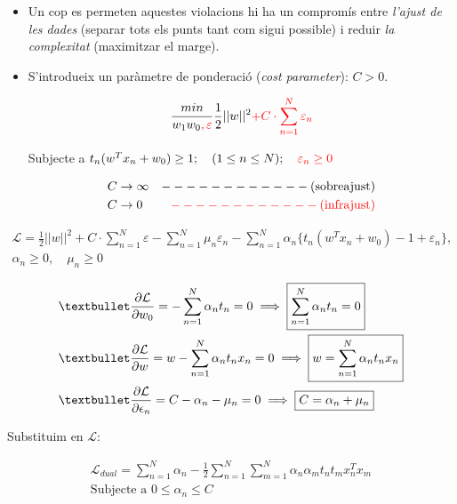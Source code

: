 \documentclass[a4paper]{article}
\begin{document}
\begin{itemize}
	\item Un cop es permeten aquestes violacions hi ha un compromís entre \emph{l'ajust de les dades} (separar tots els punts tant com sigui possible) i reduir \emph{la complexitat} (maximitzar el marge).
	
	\item S'introdueix un paràmetre de ponderació (\emph{cost parameter}): $C > 0$.
	
	$$
	\frac{min}{w_1 w_0 \textcolor{red}{,\varepsilon}} \frac{1}{2} ||w||^2 \textcolor{red}{+ C \cdot \sum_{n=1}^N \varepsilon_n}
	$$
	
	Subjecte a $t_n (w^T x_n + w_0) \ge 1; \quad (1 \le n \le N); \quad \textcolor{red}{\varepsilon_n \ge 0}$
	
	\begin{align*}
		& C \rightarrow \infty & ------------ \text{(sobreajust)} \\
		& C \rightarrow 0 & \textcolor{red}{------------ \text{(infrajust)}} 
	\end{align*}
\end{itemize}

\begin{align*}
	\mathcal{L} = \frac{1}{2} ||w||^2  + C \cdot \sum_{n=1}^N \varepsilon - \sum_{n=1}^N \mu_n \varepsilon_n - \sum_{n=1}^N \alpha_n \{ t_n (w^T x_n + w_0) - 1 + \varepsilon_n \}, \\
	\alpha_n \ge 0, \quad \mu_n \ge 0
\end{align*}

\begin{align*}
	& \textbullet \frac{\partial \mathcal{L}}{\partial w_0} = - \sum_{n=1}^N \alpha_n t_n = 0 \implies \boxed{\sum_{n=1}^N \alpha_n t_n = 0} \\
	& \textbullet \frac{\partial \mathcal{L}}{\partial w} = w - \sum_{n=1}^N \alpha_n t_n x_n = 0 \implies \boxed{w = \sum_{n=1}^N \alpha_n t_n x_n} \\
	& \textbullet \frac{\partial \mathcal{L}}{\partial \epsilon_n} = C - \alpha_n - \mu_n = 0  \implies \boxed{C= \alpha_n + \mu_n}
\end{align*}
	
Substituim en $\mathcal{L}$:

\begin{align*}
	\mathcal{L}_{dual} = \sum_{n=1}^N \alpha_n - \frac{1}{2} \sum_{n=1}^N \sum_{m=1}^N \alpha_n \alpha_m t_n t_m x_n^T x_m \\
	\text{Subjecte a } 0 \le \alpha_n \le C
\end{align*}
\end{document}
